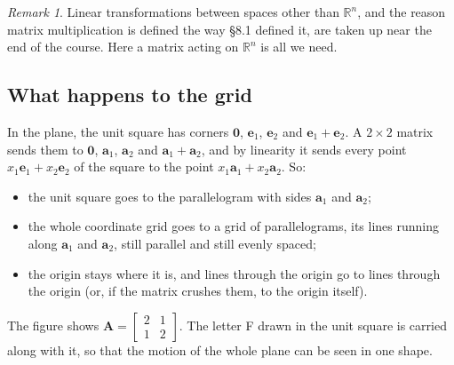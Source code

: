 \documentclass[11pt]{article}
\theoremstyle{plain}
\theoremstyle{definition}
\theoremstyle{remark}
\newtheorem*{rmk}{Remark}
\newcommand{\R}{\mathbb{R}}
\newcommand{\vc}[1]{\mathbf{#1}}        %
\newcommand{\mt}[1]{\mathbf{#1}}        %
\begin{document}
\begin{rmk}
Linear transformations between spaces other than $\R^{n}$, and the reason
matrix multiplication is defined the way \S8.1 defined it, are taken up near
the end of the course. Here a matrix acting on $\R^{n}$ is all we need.
\end{rmk}

\subsection{What happens to the grid}
In the plane, the unit square has corners $\vc{0}$, $\vc{e}_1$, $\vc{e}_2$ and
$\vc{e}_1+\vc{e}_2$. A $2\times2$ matrix sends them to $\vc{0}$, $\vc{a}_1$,
$\vc{a}_2$ and $\vc{a}_1+\vc{a}_2$, and by linearity it sends every point
$x_1\vc{e}_1+x_2\vc{e}_2$ of the square to the point $x_1\vc{a}_1+x_2\vc{a}_2$.
So:

\begin{itemize}[leftmargin=1.4em,itemsep=3pt]
  \item the unit square goes to the parallelogram with sides $\vc{a}_1$ and
        $\vc{a}_2$;
  \item the whole coordinate grid goes to a grid of parallelograms, its lines
        running along $\vc{a}_1$ and $\vc{a}_2$, still parallel and still
        evenly spaced;
  \item the origin stays where it is, and lines through the origin go to lines
        through the origin (or, if the matrix crushes them, to the origin
        itself).
\end{itemize}

\noindent The figure shows $\mt{A}=\begin{bmatrix}2&1\\1&2\end{bmatrix}$. The
letter F drawn in the unit square is carried along with it, so that the motion
of the whole plane can be seen in one shape.
\end{document}

